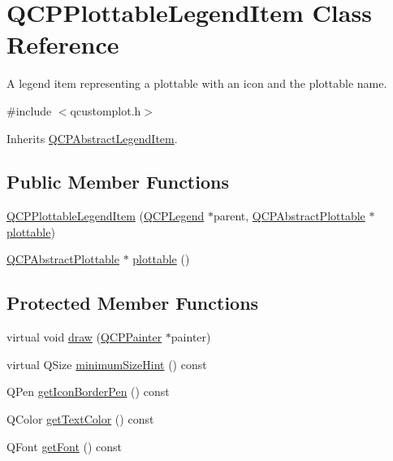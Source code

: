 \hypertarget{class_q_c_p_plottable_legend_item}{\section{Q\-C\-P\-Plottable\-Legend\-Item Class Reference}
\label{class_q_c_p_plottable_legend_item}
}


A legend item representing a plottable with an icon and the plottable name.  




{\ttfamily \#include $<$qcustomplot.\-h$>$}



Inherits \hyperlink{class_q_c_p_abstract_legend_item}{Q\-C\-P\-Abstract\-Legend\-Item}.

\subsection*{Public Member Functions}
\begin{DoxyCompactItemize}
\item 
\hyperlink{class_q_c_p_plottable_legend_item_ac1072591fe409d3dabad51b23ee4d6c5}{Q\-C\-P\-Plottable\-Legend\-Item} (\hyperlink{class_q_c_p_legend}{Q\-C\-P\-Legend} $\ast$parent, \hyperlink{class_q_c_p_abstract_plottable}{Q\-C\-P\-Abstract\-Plottable} $\ast$\hyperlink{class_q_c_p_plottable_legend_item_af29e9a2c60b4cba0cac2447b8af7b488}{plottable})
\item 
\hyperlink{class_q_c_p_abstract_plottable}{Q\-C\-P\-Abstract\-Plottable} $\ast$ \hyperlink{class_q_c_p_plottable_legend_item_af29e9a2c60b4cba0cac2447b8af7b488}{plottable} ()
\end{DoxyCompactItemize}
\subsection*{Protected Member Functions}
\begin{DoxyCompactItemize}
\item 
virtual void \hyperlink{class_q_c_p_plottable_legend_item_a68a781c3de4f9959fdf82075052d43aa}{draw} (\hyperlink{class_q_c_p_painter}{Q\-C\-P\-Painter} $\ast$painter)
\item 
virtual Q\-Size \hyperlink{class_q_c_p_plottable_legend_item_a76bad654ebc8e870392f488419a6a483}{minimum\-Size\-Hint} () const 
\item 
Q\-Pen \hyperlink{class_q_c_p_plottable_legend_item_ab36270e6b022a6961fa44136f35c0e4b}{get\-Icon\-Border\-Pen} () const 
\item 
Q\-Color \hyperlink{class_q_c_p_plottable_legend_item_ad762b07439c738660ba93e78c1d03667}{get\-Text\-Color} () const 
\item 
Q\-Font \hyperlink{class_q_c_p_plottable_legend_item_a8a85c8a25affb4895423d730164d61de}{get\-Font} () const 
\end{DoxyCompactItemize}
